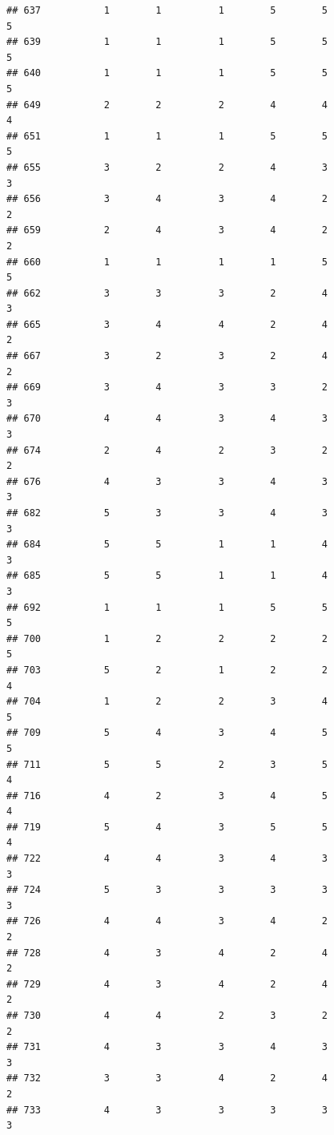 \documentclass[
]{article}
\begin{document}
\begin{verbatim}
## 637           1        1          1        5        5               5
## 639           1        1          1        5        5               5
## 640           1        1          1        5        5               5
## 649           2        2          2        4        4               4
## 651           1        1          1        5        5               5
## 655           3        2          2        4        3               3
## 656           3        4          3        4        2               2
## 659           2        4          3        4        2               2
## 660           1        1          1        1        5               5
## 662           3        3          3        2        4               3
## 665           3        4          4        2        4               2
## 667           3        2          3        2        4               2
## 669           3        4          3        3        2               3
## 670           4        4          3        4        3               3
## 674           2        4          2        3        2               2
## 676           4        3          3        4        3               3
## 682           5        3          3        4        3               3
## 684           5        5          1        1        4               3
## 685           5        5          1        1        4               3
## 692           1        1          1        5        5               5
## 700           1        2          2        2        2               5
## 703           5        2          1        2        2               4
## 704           1        2          2        3        4               5
## 709           5        4          3        4        5               5
## 711           5        5          2        3        5               4
## 716           4        2          3        4        5               4
## 719           5        4          3        5        5               4
## 722           4        4          3        4        3               3
## 724           5        3          3        3        3               3
## 726           4        4          3        4        2               2
## 728           4        3          4        2        4               2
## 729           4        3          4        2        4               2
## 730           4        4          2        3        2               2
## 731           4        3          3        4        3               3
## 732           3        3          4        2        4               2
## 733           4        3          3        3        3               3

\end{verbatim}
\end{document}
